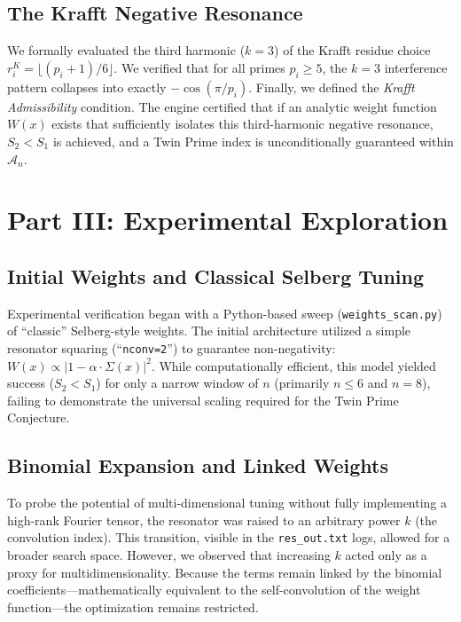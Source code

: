 \documentclass[12pt]{article}
\begin{document}
\subsection{The Krafft Negative Resonance}

We formally evaluated the third harmonic ($k=3$) of the Krafft residue choice
$r^K_i = \lfloor(p_i+1)/6\rfloor$. We verified that for all primes $p_i \ge 5$, the $k=3$
interference pattern collapses into exactly $-\cos(\pi/p_i)$. Finally, we defined the
\textit{Krafft Admissibility} condition. The engine certified that if an analytic weight function
$W(x)$ exists that sufficiently isolates this third-harmonic negative resonance, $S_2 < S_1$ is
achieved, and a Twin Prime index is unconditionally guaranteed within $\mathcal{A}_n$.

\section{Part III: Experimental Exploration}

\subsection{Initial Weights and Classical Selberg Tuning}

Experimental verification began with a Python-based sweep (\texttt{weights\_scan.py}) of
``classic'' Selberg-style weights. The initial architecture utilized a simple resonator squaring
(``\texttt{nconv=2}'') to guarantee non-negativity: $W(x) \propto |1 - \alpha \cdot \Sigma(x)|^2$.
While computationally efficient, this model yielded success ($S_2 < S_1$) for only a narrow window
of $n$ (primarily $n \le 6$ and $n=8$), failing to demonstrate the universal scaling required for
the Twin Prime Conjecture.

\subsection{Binomial Expansion and Linked Weights}

To probe the potential of multi-dimensional tuning without fully implementing a high-rank Fourier
tensor, the resonator was raised to an arbitrary power $k$ (the convolution index). This transition,
visible in the \texttt{res\_out.txt} logs, allowed for a broader search space. However, we observed
that increasing $k$ acted only as a proxy for multidimensionality. Because the terms remain linked by
the binomial coefficients—mathematically equivalent to the self-convolution of the weight
function—the optimization remains restricted. 
\end{document}
